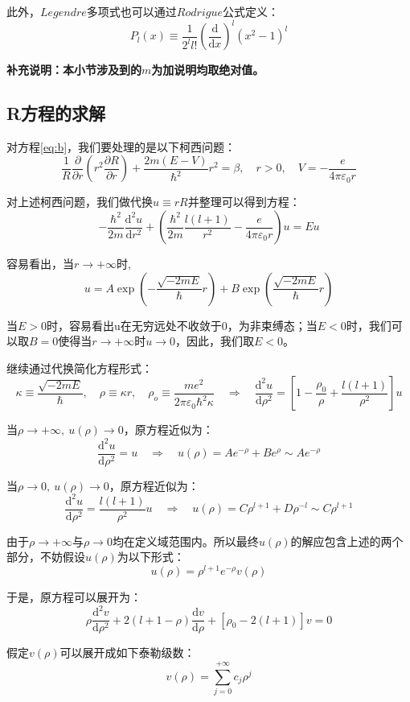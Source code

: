 此外，$Legendre$多项式也可以通过$Rodrigue$公式定义：
\[P_l(x) \equiv \frac{1}{2^ll!} \left ( \frac{\mathrm{d}}{\mathrm{d}x} \right )^l(x^2-1)^l\]

\textbf{补充说明：本小节涉及到的$m$为加说明均取绝对值。}

\subsection{R方程的求解}

对方程\ref{eq:b}，我们要处理的是以下柯西问题：
\[\frac{1}{R}\frac{\partial}{\partial{r}}(r^2\frac{\partial R}{\partial{r}})+\frac{2m(E-V)}{\hbar^2}r^2=\beta, \quad r>0, \quad V=-\frac{e}{4 \pi \varepsilon_0 r}\]

对上述柯西问题，我们做代换$u \equiv rR$并整理可以得到方程：
\[-\frac{\hbar^2}{2m}\frac{\mathrm{d^2}u}{\mathrm{d}r^2}+ \left (\frac{\hbar^2}{2m}\frac{l(l+1)}{r^2}-\frac{e}{4 \pi \varepsilon_0r} \right )u=Eu\]

容易看出，当$r \rightarrow +\infty$时,
\[u=A\exp\left(-\frac{\sqrt{-2mE}}{\hbar}r\right)+B\exp\left(\frac{\sqrt{-2mE}}{\hbar}r\right)\]

当$E>0$时，容易看出u在无穷远处不收敛于0，为非束缚态；当$E<0$时，我们可以取$B=0$使得当$r \rightarrow +\infty$时$u \rightarrow 0$，因此，我们取$E<0$。

继续通过代换简化方程形式：
\[\kappa \equiv \frac{\sqrt{-2mE}}{\hbar}, \quad \rho \equiv \kappa r, \quad \rho_o \equiv \frac{me^2}{2 \pi \varepsilon_0 \hbar^2 \kappa} \quad \Rightarrow \quad \frac{\mathrm{d^2}u}{\mathrm{d}\rho^2}=\left [ 1-\frac{\rho_0}{\rho}+\frac{l(l+1)}{\rho^2} \right ]u\]

当$\rho \rightarrow +\infty, \ u(\rho) \to 0$，原方程近似为：
\[\frac{\mathrm{d^2}u}{\mathrm{d}\rho^2}=u \quad \Rightarrow \quad u(\rho)=Ae^{-\rho}+Be^{\rho}\sim Ae^{-\rho}\]

当$\rho \rightarrow 0, \ u(\rho) \to 0$，原方程近似为：
\[\frac{\mathrm{d^2}u}{\mathrm{d}\rho^2}=\frac{l(l+1)}{\rho^2}u \quad \Rightarrow \quad u(\rho)=C\rho^{l+1}+D\rho^{-l} \sim C\rho^{l+1}\]

由于$\rho \rightarrow +\infty$与$\rho \rightarrow 0$均在定义域范围内。所以最终$u(\rho)$的解应包含上述的两个部分，不妨假设$u(\rho)$为以下形式：
\[u(\rho)=\rho^{l+1}e^{-\rho}v(\rho)\]

于是，原方程可以展开为：
\[\rho\frac{\mathrm{d^2}v}{\mathrm{d}\rho^2} +2(l+1-\rho)\frac{\mathrm{d}v}{\mathrm{d}\rho}+[\rho_0-2(l+1)]v=0 \]

假定$v(\rho)$可以展开成如下泰勒级数：
\[v(\rho)=\sum_{j=0}^{+\infty}c_j\rho^j\]

